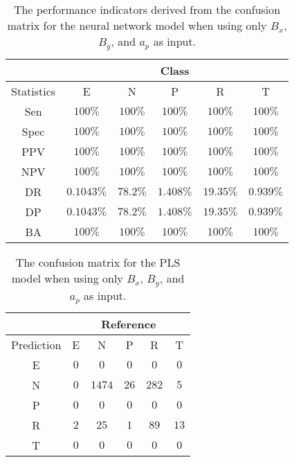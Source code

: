 \begin{table}[!ht]
	\centering
	\begin{tabular}{|c|c|c|c|c|c|}
		\hline
		 & \multicolumn{5}{c|}{Class} \\ \hline
		Statistics & E & N & P & R & T \\ \hline
		Sen & $100\%$ & $100\%$ & $100\%$ & $100\%$ & $100\%$ \\ \hline
		Spec & $100\%$ & $100\%$ & $100\%$ & $100\%$ & $100\%$ \\ \hline
		PPV & $100\%$ & $100\%$ & $100\%$ & $100\%$ & $100\%$ \\ \hline
		NPV & $100\%$ & $100\%$ & $100\%$ & $100\%$ & $100\%$ \\ \hline
		DR & $0.1043\%$ & $78.2\%$ & $1.408\%$ & $19.35\%$ & $0.939\%$ \\ \hline
		DP & $0.1043\%$ & $78.2\%$ & $1.408\%$ & $19.35\%$ & $0.939\%$ \\ \hline
		BA & $100\%$ & $100\%$ & $100\%$ & $100\%$ & $100\%$ \\ \hline
	\end{tabular}
	\caption{The performance indicators derived from the confusion matrix for the neural network model when using only $B_{x}$, $B_{y}$, and $a_{p}$ as input.}
	\label{tab:cs:reverse:xyap:nnet}
\end{table}

\begin{table}[!ht]
	\centering
	\begin{tabular}{|c|c|c|c|c|c|}
		\hline
		 & \multicolumn{5}{|c|}{Reference} \\ \hline
		 Prediction & E & N & P & R & T \\ \hline
		 E & $0$ & $0$ & $0$ & $0$ & $0$ \\ \hline
		 N & $0$ & $1474$ & $26$ & $282$ & $5$ \\ \hline
		 P & $0$ & $0$ & $0$ & $0$ & $0$ \\ \hline
		 R & $2$ & $25$ & $1$ & $89$ & $13$ \\ \hline
		 T & $0$ & $0$ & $0$ & $0$ & $0$ \\ \hline
	\end{tabular}
	\caption{The confusion matrix for the PLS model when using only $B_{x}$, $B_{y}$, and $a_{p}$ as input.}
	\label{tab:cm:xyap:pls}
\end{table}

